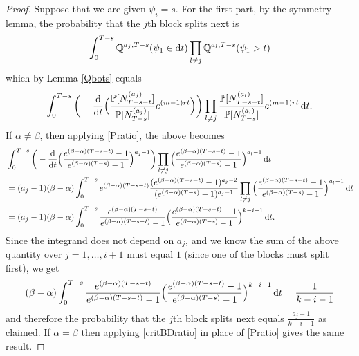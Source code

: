 \documentclass{article}
\theoremstyle{plain}
\theoremstyle{definition}
\newcommand{\Q}{\mathbb{Q}}
\renewcommand{\P}{\mathbb{P}}
\renewcommand{\d}{{\rm{d}}}
\begin{document}
\begin{proof}
Suppose that we are given $\psi_{i}=s$. For the first part, by the symmetry lemma, the probability that the $j$th block splits next is
\[\int_0^{T-s} \Q^{a_j,T-s}(\psi_1\in\d t) \prod_{l\neq j} \Q^{a_l,T-s}(\psi_1 > t)\]
which by Lemma \ref{Qbots} equals
\[\int_0^{T-s}\bigg(-\frac{\d}{\d t} \Big(\frac{\P[N^{(a_j)}_{T-s-t}]}{\P[N^{(a_j)}_{T-s}]} e^{(m-1)rt} \Big)\bigg) \prod_{l\neq j} \frac{\P[N^{(a_l)}_{T-s-t}]}{\P[N^{(a_l)}_{T-s}]} e^{(m-1)rt}\,\d t.\]
If $\alpha\neq\beta$, then applying \eqref{Pratio}, the above becomes
\begin{align*}
&\int_0^{T-s}\bigg(-\frac{\d}{\d t} \Big(\frac{e^{(\beta-\alpha)(T-s-t)}-1}{e^{(\beta-\alpha)(T-s)}-1}\Big)^{a_j-1}\bigg) \prod_{l\neq j} \Big(\frac{e^{(\beta-\alpha)(T-s-t)}-1}{e^{(\beta-\alpha)(T-s)}-1}\Big)^{a_l-1} \,\d t\\
&= (a_j-1)(\beta-\alpha)\int_0^{T-s} e^{(\beta-\alpha)(T-s-t)}\frac{(e^{(\beta-\alpha)(T-s-t)}-1)^{a_j-2}}{(e^{(\beta-\alpha)(T-s)}-1)^{a_j-1}}\prod_{l\neq j} \Big(\frac{e^{(\beta-\alpha)(T-s-t)}-1}{e^{(\beta-\alpha)(T-s)}-1}\Big)^{a_l-1} \,\d t\\
&= (a_j-1)(\beta-\alpha)\int_0^{T-s} \frac{e^{(\beta-\alpha)(T-s-t)}}{e^{(\beta-\alpha)(T-s-t)}-1} \Big(\frac{e^{(\beta-\alpha)(T-s-t)}-1}{e^{(\beta-\alpha)(T-s)}-1}\Big)^{k-i-1} \,\d t.
\end{align*}
Since the integrand does not depend on $a_j$, and we know the sum of the above quantity over $j=1,\ldots,i+1$ must equal $1$ (since one of the blocks must split first), we get
\[(\beta-\alpha)\int_0^{T-s} \frac{e^{(\beta-\alpha)(T-s-t)}}{e^{(\beta-\alpha)(T-s-t)}-1} \Big(\frac{e^{(\beta-\alpha)(T-s-t)}-1}{e^{(\beta-\alpha)(T-s)}-1}\Big)^{k-i-1} \,\d t = \frac{1}{k-i-1}\]
and therefore the probability that the $j$th block splits next equals $\frac{a_j-1}{k-i-1}$ as claimed. If $\alpha=\beta$ then applying \eqref{critBDratio} in place of \eqref{Pratio} gives the same result.


\end{proof}
\end{document}
